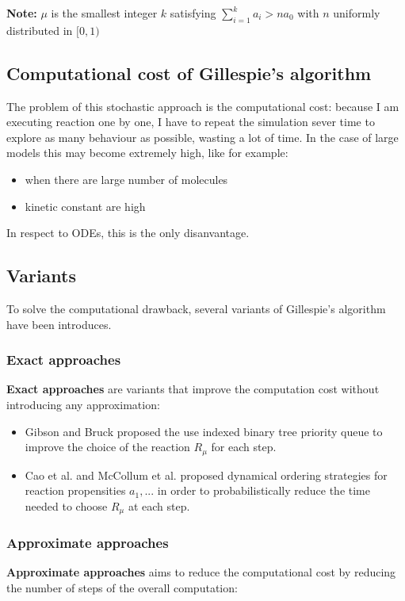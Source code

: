 \textbf{Note:} $\mu$ is the smallest integer $k$ satisfying $\sum^{k}_{i=1} a_{i} > na_{0}$ with $n$ uniformly distributed in $[0,1)$

\subsection{Computational cost of Gillespie's algorithm}
The problem of this stochastic approach is the computational cost: because I am executing reaction one by one, I have to repeat the simulation sever time to explore as many behaviour as possible, wasting a lot of time. In the case of large models this may become extremely high, like for example:

\begin{itemize}
    \item when there are large number of molecules
    \item kinetic constant are high
\end{itemize}
In respect to ODEs, this is the only disanvantage.   

\subsection{Variants}
To solve the computational drawback, several variants of Gillespie's algorithm have been introduces.

\subsubsection{Exact approaches}
\textbf{Exact approaches} are variants that improve the computation cost without introducing any approximation:

\begin{itemize}
    \item Gibson and Bruck proposed the use indexed binary tree priority queue to improve the choice of the reaction $R_\mu$ for each step.
    \item Cao et al. and McCollum et al. proposed dynamical ordering strategies for reaction propensities $a_{1}, ...$ in order to probabilistically reduce the time needed to choose $R_\mu$ at each step.
\end{itemize}

\subsubsection{Approximate approaches}
\textbf{Approximate approaches} aims to reduce the computational cost by reducing the number of steps of the overall computation:

